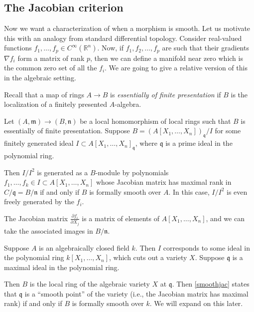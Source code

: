 \subsection{The Jacobian criterion}


Now we want  a characterization of when a morphism is smooth. Let us
motivate this with an analogy from standard differential topology. 
Consider real-valued functions $f_1, \dots, f_p \in C^{\infty}(\mathbb{R}^n)$.
Now, if $f_1, f_2, \dots, f_p$ are such that their gradients $\nabla f_i$ form a
matrix of rank $p$, then we can define a manifold near zero
which is the common zero set of all the $f_i$.
We are going to give a relative version of this in the algebraic setting.



Recall that a map of rings $A \to B$ is \emph{essentially of finite
presentation} if $B$ is the localization of a finitely presented $A$-algebra.


\begin{proposition} \label{smoothjac}
Let $(A, \mathfrak{m}) \to (B, \mathfrak{n})$ be a local homomorphism of local
rings such that $B$ is essentially of finite presentation.
Suppose $B = (A[X_1, \dots, X_n])_{\mathfrak{q}}/I$ for some finitely generated
ideal $I \subset A[X_1, \dots, X_n]_{\mathfrak{q}}$, where $\mathfrak{q}$ is a
prime ideal in the polynomial ring.

Then $I/I^2$ is generated as a $B$-module by polynomials
$f_1, \dots, f_k \in I \subset A[X_1, \dots, X_n]$ whose Jacobian matrix has maximal rank
in $C/\mathfrak{q} = B/\mathfrak{n}$ if and only if $B$ is formally smooth over $A$.
In this case, $I/I^2$ is even freely generated by the $f_i$.
\end{proposition} 

The Jacobian matrix $\frac{\partial f_i}{\partial X_j}$ is a matrix of
elements of $A[X_1, \dots, X_n]$, and we can take the associated images in
$B/\mathfrak{n}$. 

\begin{example} 
Suppose $A$ is an algebraically closed field $k$. 
Then $I$ corresponds to some ideal in the polynomial ring $k[X_1, \dots,
X_n]$, which cuts out a variety $X$.
Suppose $\mathfrak{q}$ is a maximal ideal in the polynomial ring.

Then $B$ is the  local 
ring of the  algebraic variety $X$ at $\mathfrak{q}$. 
Then \cref{smoothjac} states that $\mathfrak{q}$ is  a ``smooth point''
of the variety (i.e., the Jacobian matrix has maximal rank) if and only if
$B$ is formally smooth over $k$. 
We will expand on this later. 
\end{example} 


